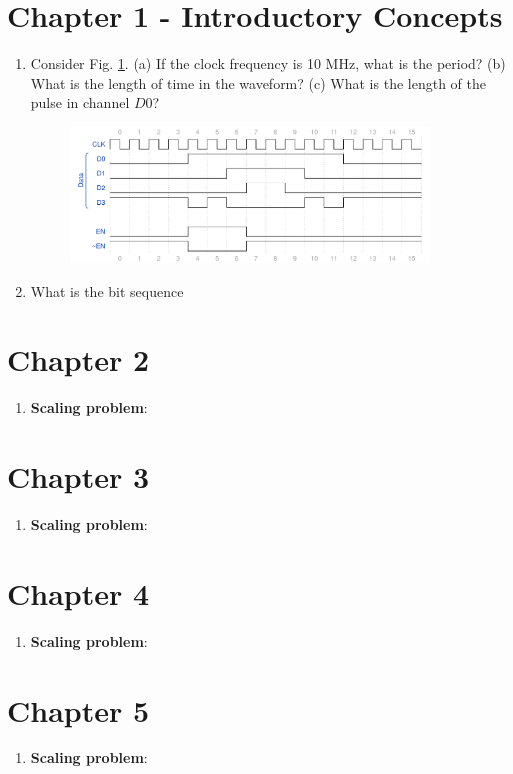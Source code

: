 \documentclass[10pt]{article}
\begin{document}
\maketitle

\section{Chapter 1 - Introductory Concepts}

\begin{enumerate}
\item Consider Fig. \ref{fig:timing1}. (a) If the clock frequency is 10 MHz, what is the period?  (b) What is the length of time in the waveform? (c) What is the length of the pulse in channel $D0$?
\begin{figure}[ht]
\centering
\includegraphics[width=0.9\textwidth]{timingExample1.pdf}
\caption{\label{fig:timing1}}
\end{figure}
\item What is the bit sequence
\end{enumerate}

\section{Chapter 2}

\begin{enumerate}
\item \textbf{Scaling problem}: 
\end{enumerate}

\section{Chapter 3}

\begin{enumerate}
\item \textbf{Scaling problem}: 
\end{enumerate}

\section{Chapter 4}

\begin{enumerate}
\item \textbf{Scaling problem}: 
\end{enumerate}

\section{Chapter 5}

\begin{enumerate}
\item \textbf{Scaling problem}: 
\end{enumerate}
\end{document}
